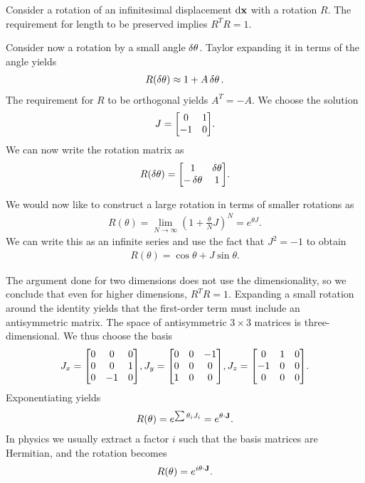 Consider a rotation of an infinitesimal displacement $\dd{\vb{x}}$ with a rotation $R$. The requirement for length to be preserved implies $R^{T}R = 1$.

Consider now a rotation by a small angle $\var{\theta}$. Taylor expanding it in terms of the angle yields
\begin{align*}
	R(\var{\theta}) \approx 1 + A\var{\theta}.
\end{align*}
The requirement for $R$ to be orthogonal yields $A^{T} = -A$. We choose the solution
\begin{align*}
	J =
	\mqty[
		0  & 1 \\
		-1 & 0
	].
\end{align*}
We can now write the rotation matrix as
\begin{align*}
	R(\var{\theta}) =
	\mqty[
		1             & \var{\theta} \\
		-\var{\theta} & 1
	].
\end{align*}

We would now like to construct a large rotation in terms of smaller rotations as
\begin{align*}
	R(\theta) = \lim\limits_{N\to\infty}\left(1 + \frac{\theta}{N}J\right)^{N} = e^{\theta J}.
\end{align*}
We can write this as an infinite series and use the fact that $J^{2} = -1$ to obtain
\begin{align*}
	R(\theta) = \cos{\theta} + J\sin{\theta}.
\end{align*}

The argument done for two dimensions does not use the dimensionality, so we conclude that even for higher dimensions, $R^{T}R = 1$. Expanding a small rotation around the identity yields that the first-order term must include an antisymmetric matrix. The space of antisymmetric $3\times 3$ matrices is three-dimensional. We thus choose the basis
\begin{align*}
	J_{x} =
	\mqty[
		0 & 0  & 0 \\
		0 & 0  & 1 \\
		0 & -1 & 0
	],
	J_{y} =
	\mqty[
		0 & 0 & -1 \\
		0 & 0 & 0  \\
		1 & 0 & 0
	],
	J_{z} =
	\mqty[
		0  & 1 & 0 \\
		-1 & 0 & 0 \\
		0  & 0 & 0
	].
\end{align*}
Exponentiating yields
\begin{align*}
	R(\theta) = e^{\sum \theta_{i}J_{i}} = e^{\vb{\theta}\cdot\vb{J}}.
\end{align*}
In physics we usually extract a factor $i$ such that the basis matrices are Hermitian, and the rotation becomes
\begin{align*}
	R(\theta) = e^{i\vb{\theta}\cdot\vb{J}}.
\end{align*}

